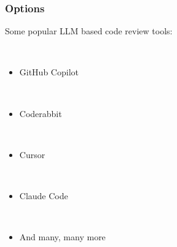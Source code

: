 \documentclass{beamer}
\begin{document}

\begin{frame}
\begin{center}
\frametitle{Options}

Some popular LLM based code review tools:

~\\

\begin{itemize}

\item GitHub Copilot

~\\

\item Coderabbit

~\\

\item Cursor

~\\

\item Claude Code

~\\

\item And many, many more

\end{itemize}

\end{center}
\end{frame}

\end{document}
